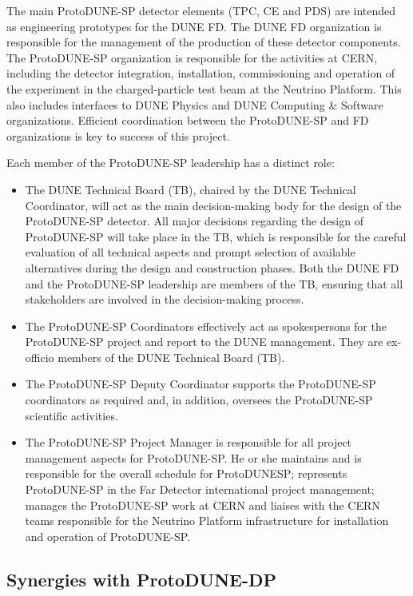 The main ProtoDUNE-SP detector elements (TPC, CE and PDS) are intended as engineering prototypes for the DUNE FD. The DUNE FD organization is responsible for the management of the production of these detector components. The ProtoDUNE-SP organization is responsible for the activities at CERN, including the detector integration, installation, commissioning and operation of the experiment in the charged-particle test beam at the Neutrino Platform.  This also includes interfaces to DUNE Physics and DUNE Computing \& Software organizations. Efficient coordination between the ProtoDUNE-SP and FD organizations is key to success of this project.



Each member of the ProtoDUNE-SP leadership has a distinct role:
\begin{itemize}
\item The DUNE Technical Board (TB), chaired by the DUNE Technical Coordinator, will act as the main decision-making body for the design of the ProtoDUNE-SP detector. All major decisions regarding the design of ProtoDUNE-SP will take place in the TB, which is responsible for the careful evaluation of all technical aspects and prompt selection of available alternatives during the design and construction phases. Both the DUNE FD and the ProtoDUNE-SP leadership are members of the TB, ensuring that all stakeholders are involved in the decision-making process.
\item The ProtoDUNE-SP Coordinators effectively act as spokespersons for the ProtoDUNE-SP project and report to the DUNE management. They are ex-officio members of the DUNE Technical Board (TB).
\item The ProtoDUNE-SP Deputy Coordinator supports the ProtoDUNE-SP coordinators as required and, in addition, oversees the ProtoDUNE-SP scientific activities. 
\item The ProtoDUNE-SP Project Manager is responsible for all project management aspects for ProtoDUNE-SP. He or she maintains and is responsible for the overall schedule for ProtoDUNESP; represents ProtoDUNE-SP in the Far Detector international project management; manages the ProtoDUNE-SP work at CERN and liaises with the CERN teams responsible for the Neutrino Platform infrastructure for installation and operation of ProtoDUNE-SP.
\end{itemize}

\subsection{Synergies with ProtoDUNE-DP}

